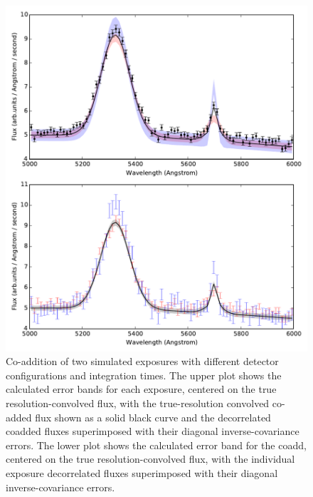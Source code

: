 \documentclass[12pt]{article}
\begin{document}
\begin{figure}[htb]
\begin{center}
\includegraphics[width=5.5in]{fig/stacked}
\caption{Co-addition of two simulated exposures with different detector configurations and integration times. The upper plot shows the calculated error bands for each exposure, centered on the true resolution-convolved flux, with the true-resolution convolved co-added flux shown as a solid black curve and the decorrelated coadded fluxes superimposed with their diagonal inverse-covariance errors. The lower plot shows the calculated error band for the coadd, centered on the true resolution-convolved flux, with the individual exposure decorrelated fluxes superimposed with their diagonal inverse-covariance errors.}
\label{fig:stacked}
\end{center}
\end{figure}
\end{document}

